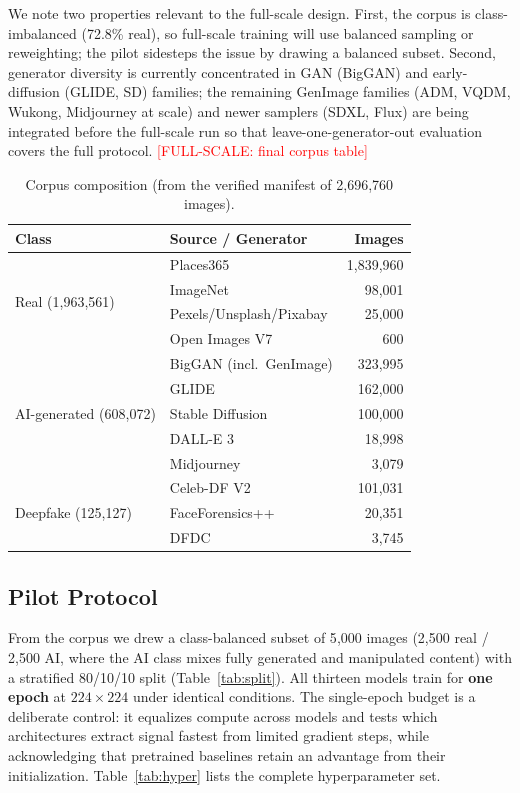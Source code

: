 \documentclass[journal]{IEEEtran}
\newcommand{\fullscale}[1]{\textcolor{red}{[FULL-SCALE: #1]}}
\begin{document}
We note two properties relevant to the full-scale design. First, the corpus is class-imbalanced (72.8\% real), so full-scale training will use balanced sampling or reweighting; the pilot sidesteps the issue by drawing a balanced subset. Second, generator diversity is currently concentrated in GAN (BigGAN) and early-diffusion (GLIDE, SD) families; the remaining GenImage families (ADM, VQDM, Wukong, Midjourney at scale) and newer samplers (SDXL, Flux) are being integrated before the full-scale run so that leave-one-generator-out evaluation covers the full protocol. \fullscale{final corpus table}

\begin{table}[!t]
\renewcommand{\arraystretch}{1.2}
\caption{Corpus composition (from the verified manifest of 2{,}696{,}760 images).}
\label{tab:corpus}
\centering
\setlength{\tabcolsep}{4pt}
\begin{tabular}{llr}
\toprule
Class & Source / Generator & Images \\
\midrule
\multirow{4}{*}{Real (1{,}963{,}561)}
 & Places365            & 1{,}839{,}960 \\
 & ImageNet             & 98{,}001 \\
 & Pexels/Unsplash/Pixabay & 25{,}000 \\
 & Open Images V7       & 600 \\
\midrule
\multirow{5}{*}{AI-generated (608{,}072)}
 & BigGAN (incl.\ GenImage) & 323{,}995 \\
 & GLIDE                & 162{,}000 \\
 & Stable Diffusion     & 100{,}000 \\
 & DALL-E 3             & 18{,}998 \\
 & Midjourney           & 3{,}079 \\
\midrule
\multirow{3}{*}{Deepfake (125{,}127)}
 & Celeb-DF V2          & 101{,}031 \\
 & FaceForensics++      & 20{,}351 \\
 & DFDC                 & 3{,}745 \\
\bottomrule
\end{tabular}
\end{table}

\subsection{Pilot Protocol}
\label{sec:pilot}
From the corpus we drew a class-balanced subset of 5{,}000 images (2{,}500 real / 2{,}500 AI, where the AI class mixes fully generated and manipulated content) with a stratified 80/10/10 split (Table~\ref{tab:split}). All thirteen models train for \textbf{one epoch} at $224\times224$ under identical conditions. The single-epoch budget is a deliberate control: it equalizes compute across models and tests which architectures extract signal fastest from limited gradient steps, while acknowledging that pretrained baselines retain an advantage from their initialization. Table~\ref{tab:hyper} lists the complete hyperparameter set.
\end{document}
